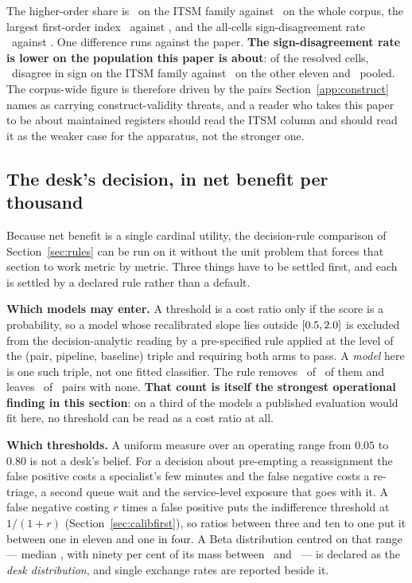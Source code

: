 The higher-order share is \itsmHigherOrderPct\ on the ITSM family against
\interactionTotalPct\ on the whole corpus, the largest first-order index
\itsmLargestFirstOrderPct\ against \largestFirstOrderPct, and the all-cells
sign-disagreement rate \misreportItsmPct\ against \misreportEqualPct. One
difference runs against the paper. \textbf{The sign-disagreement rate is
lower on the population this paper is about}: of the resolved cells,
\misreportPooledItsmPct\ disagree in sign on the ITSM family against
\misreportPooledOtherPct\ on the other eleven and
\misreportPooledResolvedPct\ pooled. The corpus-wide figure is therefore
driven by the pairs Section~\ref{app:construct} names as carrying
construct-validity threats, and a reader who takes this paper to be about
maintained registers should read the ITSM column and should read it as the
weaker case for the apparatus, not the stronger one.

\subsection{The desk's decision, in net benefit per thousand}
\label{app:deskfull}


Because net benefit is a single cardinal utility, the decision-rule comparison
of Section~\ref{sec:rules} can be run on it without the unit problem that
forces that section to work metric by metric. Three things have to be
settled first, and each is settled by a declared rule rather than a default.

\textbf{Which models may enter.} A threshold is a cost ratio only if the score
is a probability, so a model whose recalibrated slope lies outside
$[0.5, 2.0]$ is excluded from the decision-analytic reading by a
pre-specified rule applied at the level of the (pair, pipeline, baseline) triple
and requiring both arms to pass. A \emph{model} here is one such triple,
not one fitted classifier. The rule removes \nModelsDcaExcluded\ of
\nModelsDca\ of them and leaves \nPairsDcaExcluded\ of \nPairs\ pairs
with none. \textbf{That count is itself the strongest operational finding in this
section}: on a third of the models a published evaluation would fit here, no
threshold can be read as a cost ratio at all.

\textbf{Which thresholds.} A uniform measure over an operating range from
$0.05$ to $0.80$ is not a desk's belief. For a decision about pre-empting a
reassignment the false positive costs a specialist's few minutes and the false
negative costs a re-triage, a second queue wait and the service-level exposure
that goes with it. A false negative costing $r$ times a false positive puts
the indifference threshold at $1/(1+r)$ (Section~\ref{sec:calibfirst}), so
ratios between three and ten to one put it between one in eleven and one in
four. A Beta distribution centred on that range --- median \deskQmid, with
ninety per cent of its mass between \deskQlo\ and \deskQhi\ --- is declared
as the \emph{desk distribution}, and single exchange rates are reported
beside it.


